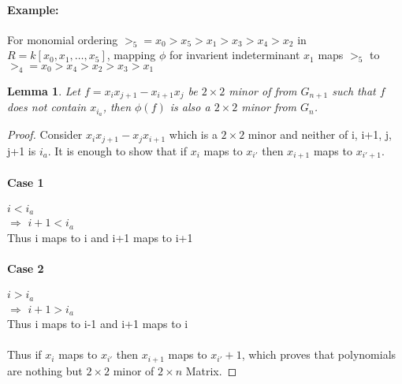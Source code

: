 \documentclass[12pt,a4paper]{article}
\newtheorem{lemma}{Lemma}
\theoremstyle{definition}
\begin{document}
\paragraph*{Example:}
For monomial ordering $>_5=x_0>x_5>x_1>x_3>x_4>x_2$ in $R=k[x_0, x_1, \ldots , x_5]$, mapping $\phi$ for invarient indeterminant $x_1$ maps $>_5$ to $>_4=x_0>x_4>x_2>x_3>x_1$

\begin{lemma}
Let $f=x_{i}x_{j+1}-x_{i+1}x_{j}$ be $2\times 2$ minor of from $G_{n+1}$ such that $f$ does not contain $x_{i_{a}}$, then $\phi(f)$ is also a $2 \times 2$ minor from $G_{n}$. 
\end{lemma}
\begin{proof}
Consider $x_{i}x_{j+1}-x_{j}x_{i+1}$ which is a $2\times 2$ minor and neither of i, i+1, j, j+1 is $i_{a}$. It is enough to show that if $x_{i}$ maps to $x_{i'}$ then $x_{i+1}$ maps to $x_{i'+1}$.
\\

\paragraph*{Case 1}
$i<i_{a}$ \\
$\Rightarrow$ $i+1<i_{a}$\\
Thus i maps to i and i+1 maps to i+1
\paragraph*{Case 2}
$i>i_{a}$ \\
$\Rightarrow$ $i+1>i_{a}$\\
Thus i maps to i-1 and i+1 maps to i\\
\paragraph*{}
Thus if $x_{i}$ maps to $x_{i'}$ then $x_{i+1}$ maps to $x_{i'}+1$, which proves that polynomials are nothing but $2\times 2$ minor of $2\times n$ Matrix.
\end{proof}
\end{document}
